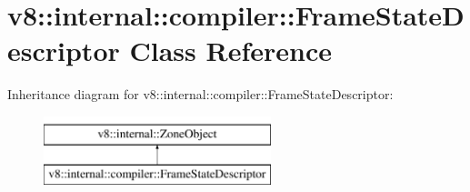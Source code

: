 \hypertarget{classv8_1_1internal_1_1compiler_1_1FrameStateDescriptor}{}\section{v8\+:\+:internal\+:\+:compiler\+:\+:Frame\+State\+Descriptor Class Reference}
\label{classv8_1_1internal_1_1compiler_1_1FrameStateDescriptor}
Inheritance diagram for v8\+:\+:internal\+:\+:compiler\+:\+:Frame\+State\+Descriptor\+:\begin{figure}[H]
\begin{center}
\leavevmode
\includegraphics[height=2.000000cm]{classv8_1_1internal_1_1compiler_1_1FrameStateDescriptor}
\end{center}
\end{figure}
